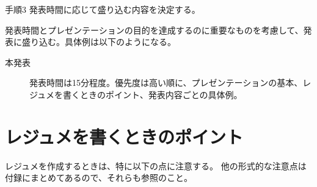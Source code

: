 \documentclass[a4j]{jsarticle}
\begin{document}
\begin{itembox}[l]{手順3}
発表時間に応じて盛り込む内容を決定する。
\end{itembox}

発表時間とプレゼンテーションの目的を達成するのに重要なものを考慮して、発表に盛り込む。具体例は以下のようになる。

\begin{description}
\item[本発表]発表時間は15分程度。優先度は高い順に、プレゼンテーションの基本、レジュメを書くときのポイント、発表内容ごとの具体例。
\end{description}

\section{レジュメを書くときのポイント}
レジュメを作成するときは、特に以下の点に注意する。
他の形式的な注意点は付録にまとめてあるので、それらも参照のこと。
\end{document}
